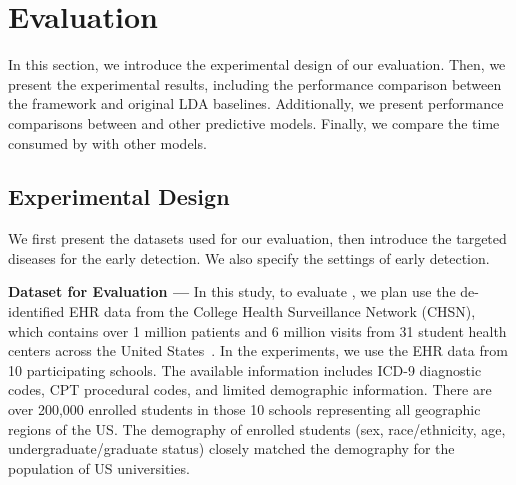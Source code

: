 \section{Evaluation}\label{sec:5}
In this section, we introduce the experimental design of our evaluation.
Then, we present the experimental results, including the performance comparison between the \TheName{} framework and original LDA baselines.
Additionally, we present performance comparisons between \TheName{} and other predictive models. 
Finally, we compare the time consumed by \TheName{} with other models.

\subsection{Experimental Design}
We first present the datasets used for our evaluation, then introduce the targeted diseases for the early detection.  We also specify the settings of early detection.

\textbf{Dataset for Evaluation --- } In this study, to evaluate \TheName{}, we plan use the de-identified EHR data from the College Health Surveillance Network (CHSN), which contains over 1 million patients and 6 million visits from 31 student health centers across the United States~\cite{turner_college_2015}.
In the experiments, we use the EHR data from 10 participating schools.
The available information includes ICD-9 diagnostic codes, CPT procedural codes, and limited demographic information.
There are over 200,000 enrolled students in those 10 schools representing all geographic regions of the US.
The demography of enrolled students (sex, race/ethnicity, age, undergraduate/graduate status) closely matched the demography for the population of US universities.


